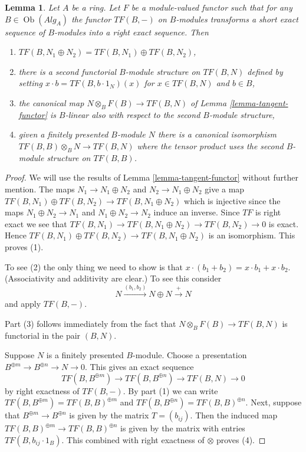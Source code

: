\documentclass{stacks-project}
\theoremstyle{plain}
\newtheorem{lemma}[subsection]{Lemma}
\theoremstyle{definition}
\theoremstyle{remark}
\numberwithin{equation}{subsection}
\def\Ob{\mathop{\mathrm{Ob}}\nolimits}
\begin{document}
\begin{lemma}
\label{lemma-exactness-implies}
Let $A$ be a ring. Let $F$ be a module-valued functor
such that for any $B \in \Ob(\textit{Alg}_A)$ the
functor $TF(B, -)$ on $B$-modules transforms a short exact sequence
of $B$-modules into a right exact sequence. Then
\begin{enumerate}
\item $TF(B, N_1 \oplus N_2) = TF(B, N_1) \oplus TF(B, N_2)$,
\item there is a second functorial $B$-module structure on $TF(B, N)$
defined by setting $x \cdot b = TF(B, b\cdot 1_N)(x)$ for $x \in TF(B, N)$
and $b \in B$,
\item
\label{item-mult-map-linear}
the canonical map $N \otimes_B F(B) \to TF(B, N)$ of
Lemma \ref{lemma-tangent-functor}
is $B$-linear also with respect to the second $B$-module structure,
\item
\label{item-tangent-right-exact}
given a finitely presented $B$-module $N$ there is a canonical
isomorphism $TF(B, B) \otimes_B N \to TF(B, N)$ where the tensor
product uses the second $B$-module structure on $TF(B, B)$.
\end{enumerate}
\end{lemma}

\begin{proof}
We will use the results of
Lemma \ref{lemma-tangent-functor}
without further mention.
The maps $N_1 \to N_1 \oplus N_2$ and $N_2 \to N_1 \oplus N_2$ give
a map $TF(B, N_1) \oplus TF(B, N_2) \to TF(B, N_1 \oplus N_2)$
which is injective since the maps $N_1 \oplus N_2 \to N_1$ and
$N_1 \oplus N_2 \to N_2$ induce an inverse.
Since $TF$ is right exact we see that
$TF(B, N_1) \to TF(B, N_1 \oplus N_2) \to TF(B, N_2) \to 0$ is exact.
Hence $TF(B, N_1) \oplus TF(B, N_2) \to TF(B, N_1 \oplus N_2)$ is an
isomorphism. This proves (1).

\medskip\noindent
To see (2) the only thing we need to show is that
$x \cdot (b_1 + b_2) = x \cdot b_1 + x \cdot b_2$.
(Associativity and additivity are clear.) To see this consider
$$
N \xrightarrow{(b_1, b_2)} N \oplus N \xrightarrow{+} N
$$
and apply $TF(B, -)$.

\medskip\noindent
Part (3) follows immediately from the fact that
$N \otimes_B F(B) \to TF(B, N)$ is functorial in the pair $(B, N)$.

\medskip\noindent
Suppose $N$ is a finitely presented $B$-module. Choose a presentation
$B^{\oplus m} \to B^{\oplus n} \to N \to 0$. This gives an exact
sequence
$$
TF(B, B^{\oplus m}) \to TF(B, B^{\oplus n}) \to TF(B, N) \to 0
$$
by right exactness of $TF(B, -)$. By part (1) we can write
$TF(B, B^{\oplus m}) = TF(B, B)^{\oplus m}$ and
$TF(B, B^{\oplus n}) = TF(B, B)^{\oplus n}$. Next, suppose that
$B^{\oplus m} \to B^{\oplus n}$ is given by the matrix $T = (b_{ij})$.
Then the induced map $TF(B, B)^{\oplus m} \to TF(B, B)^{\oplus n}$
is given by the matrix with entries $TF(B, b_{ij} \cdot 1_B)$.
This combined with right exactness of $\otimes$ proves (4).
\end{proof}
\end{document}
